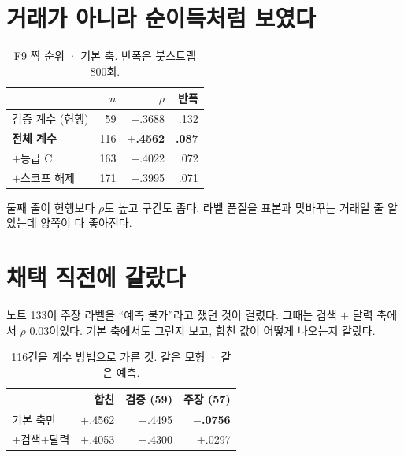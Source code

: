 \documentclass[10pt]{article}
\begin{document}

\section{거래가 아니라 순이득처럼 보였다}

\begin{table}[t]
\centering\tsize
\caption{F9 짝 순위 · 기본 축. 반폭은 붓스트랩 800회.}
\begin{tabular}{lrrr}
\toprule
& $n$ & $\rho$ & 반폭 \\
\midrule
검증 계수 (현행) & 59 & $+$.3688 & .132 \\
\textbf{전체 계수} & 116 & \textbf{$+$.4562} & \textbf{.087} \\
$+$등급 C & 163 & $+$.4022 & .072 \\
$+$스코프 해제 & 171 & $+$.3995 & .071 \\
\bottomrule
\end{tabular}
\end{table}

둘째 줄이 현행보다 $\rho$도 높고 구간도 좁다. 라벨 품질을 표본과 맞바꾸는
거래일 줄 알았는데 양쪽이 다 좋아진다.

\section{채택 직전에 갈랐다}

노트 133이 주장 라벨을 ``예측 불가''라고 쟀던 것이 걸렸다. 그때는 검색 $+$
달력 축에서 $\rho$ 0.03이었다. 기본 축에서도 그런지 보고, 합친 값이 어떻게
나오는지 갈랐다.

\begin{table}[t]
\centering\tsize
\caption{116건을 계수 방법으로 가른 것. 같은 모형 · 같은 예측.}
\begin{tabular}{lrrr}
\toprule
& 합친 & 검증 (59) & 주장 (57) \\
\midrule
기본 축만 & $+$.4562 & $+$.4495 & \textbf{$-$.0756} \\
$+$검색$+$달력 & $+$.4053 & $+$.4300 & $+$.0297 \\
\bottomrule
\end{tabular}
\end{table}
\end{document}
